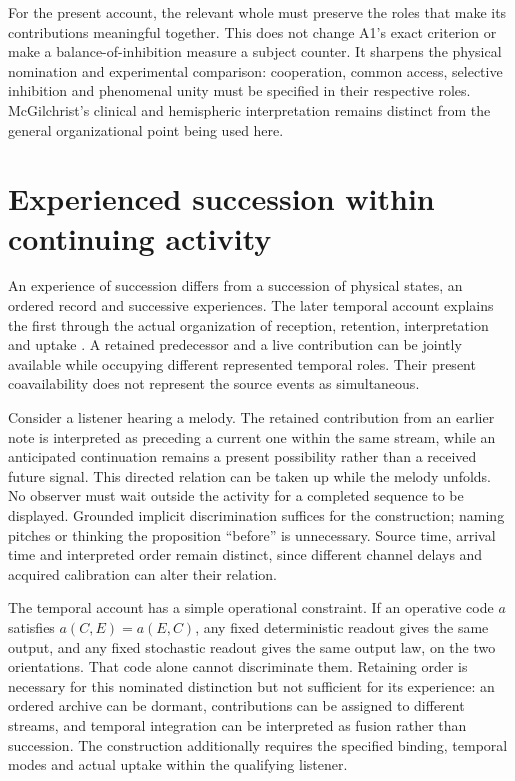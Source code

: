 For the present account, the relevant whole must preserve the roles that make its contributions meaningful together. This does not change A1's exact criterion or make a balance-of-inhibition measure a subject counter. It sharpens the physical nomination and experimental comparison: cooperation, common access, selective inhibition and phenomenal unity must be specified in their respective roles. McGilchrist's clinical and hemispheric interpretation remains distinct from the general organizational point being used here.

\section{Experienced succession within continuing activity}\label{sec:enacted-temporal-passage}
An experience of succession differs from a succession of physical states, an ordered record and successive experiences. The later temporal account explains the first through the actual organization of reception, retention, interpretation and uptake \cite{RodgersTemporal2026}. A retained predecessor and a live contribution can be jointly available while occupying different represented temporal roles. Their present coavailability does not represent the source events as simultaneous.

Consider a listener hearing a melody. The retained contribution from an earlier note is interpreted as preceding a current one within the same stream, while an anticipated continuation remains a present possibility rather than a received future signal. This directed relation can be taken up while the melody unfolds. No observer must wait outside the activity for a completed sequence to be displayed. Grounded implicit discrimination suffices for the construction; naming pitches or thinking the proposition ``before'' is unnecessary. Source time, arrival time and interpreted order remain distinct, since different channel delays and acquired calibration can alter their relation.

The temporal account has a simple operational constraint. If an operative code $a$ satisfies $a(C,E)=a(E,C)$, any fixed deterministic readout gives the same output, and any fixed stochastic readout gives the same output law, on the two orientations. That code alone cannot discriminate them. Retaining order is necessary for this nominated distinction but not sufficient for its experience: an ordered archive can be dormant, contributions can be assigned to different streams, and temporal integration can be interpreted as fusion rather than succession. The construction additionally requires the specified binding, temporal modes and actual uptake within the qualifying listener.

